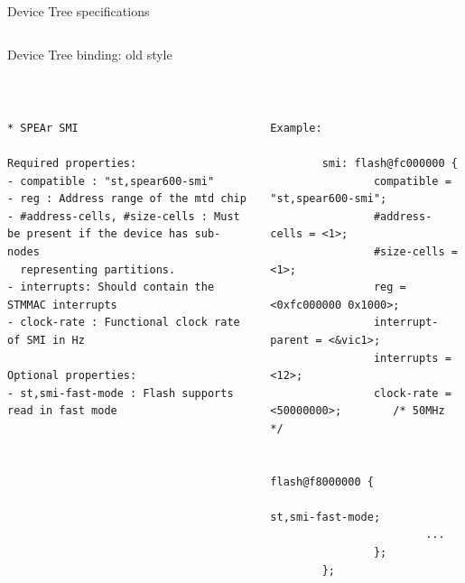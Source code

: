 \begin{frame}{Device Tree specifications}
\begin{columns}
  \end{columns}
\end{frame}

\begin{frame}[fragile]{Device Tree binding: old style}
  \begin{center}
    \\
  \end{center}
  \begin{columns}[t]
    \begin{block}{}
      {\fontsize{5}{6}\selectfont
\begin{verbatim}
* SPEAr SMI

Required properties:
- compatible : "st,spear600-smi"
- reg : Address range of the mtd chip
- #address-cells, #size-cells : Must be present if the device has sub-nodes
  representing partitions.
- interrupts: Should contain the STMMAC interrupts
- clock-rate : Functional clock rate of SMI in Hz

Optional properties:
- st,smi-fast-mode : Flash supports read in fast mode

\end{verbatim}
      }
    \end{block}
    \begin{block}{}
      {\fontsize{4}{5}\selectfont
\begin{verbatim}
Example:

        smi: flash@fc000000 {
                compatible = "st,spear600-smi";
                #address-cells = <1>;
                #size-cells = <1>;
                reg = <0xfc000000 0x1000>;
                interrupt-parent = <&vic1>;
                interrupts = <12>;
                clock-rate = <50000000>;        /* 50MHz */

                flash@f8000000 {
                        st,smi-fast-mode;
                        ...
                };
        };
\end{verbatim}
      }
    \end{block}
  \end{columns}
\end{frame}

